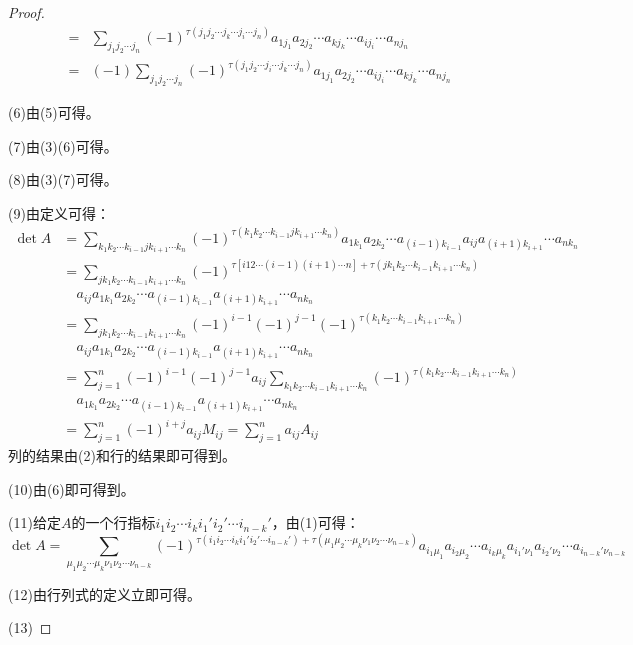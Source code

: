 \begin{proof}
\begin{align*}
		=&\sum_{j_1j_2\cdots j_n}^{}(-1)^{\tau(j_1j_2\cdots j_k\cdots j_i\cdots j_n)}a_{1j_1}a_{2j_2}\cdots a_{kj_k}\cdots a_{ij_i}\cdots a_{nj_n} \\
		=&(-1)\sum_{j_1j_2\cdots j_n}^{}(-1)^{\tau(j_1j_2\cdots j_i\cdots j_k\cdots j_n)}a_{1j_1}a_{2j_2}\cdots a_{ij_i}\cdots a_{kj_k}\cdots a_{nj_n}
	\end{align*}\par
	(6)由(5)可得。\par
	(7)由(3)(6)可得。\par
	(8)由(3)(7)可得。\par
	(9)由定义可得：
	\begin{align*}
		\det A&=\sum_{k_1k_2\cdots k_{i-1}jk_{i+1}\cdots k_n}^{}(-1)^{\tau(k_1k_2\cdots k_{i-1}jk_{i+1}\cdots k_n)}a_{1k_1}a_{2k_2}\cdots a_{(i-1)k_{i-1}}a_{ij}a_{(i+1)k_{i+1}}\cdots a_{nk_n} \\
		&=\sum_{jk_1k_2\cdots k_{i-1}k_{i+1}\cdots k_n}^{}(-1)^{\tau[i12\cdots(i-1)(i+1)\cdots n]+\tau(jk_1k_2\cdots k_{i-1}k_{i+1}\cdots k_n)} \\
		&\quad a_{ij}a_{1k_1}a_{2k_2}\cdots a_{(i-1)k_{i-1}}a_{(i+1)k_{i+1}}\cdots a_{nk_n} \\
		&=\sum_{jk_1k_2\cdots k_{i-1}k_{i+1}\cdots k_n}^{}(-1)^{i-1}(-1)^{j-1}(-1)^{\tau(k_1k_2\cdots k_{i-1}k_{i+1}\cdots k_n)} \\
		&\quad a_{ij}a_{1k_1}a_{2k_2}\cdots a_{(i-1)k_{i-1}}a_{(i+1)k_{i+1}}\cdots a_{nk_n} \\
		&=\sum_{j=1}^{n}(-1)^{i-1}(-1)^{j-1}a_{ij}\sum_{k_1k_2\cdots k_{i-1}k_{i+1}\cdots k_n}(-1)^{\tau(k_1k_2\cdots k_{i-1}k_{i+1}\cdots k_n)} \\
		&\quad a_{1k_1}a_{2k_2}\cdots a_{(i-1)k_{i-1}}a_{(i+1)k_{i+1}}\cdots a_{nk_n} \\
		&=\sum_{j=1}^{n}(-1)^{i+j}a_{ij}M_{ij}=\sum_{j=1}^{n}a_{ij}A_{ij}
	\end{align*}
	列的结果由(2)和行的结果即可得到。\par
	(10)由(6)即可得到。\par
	(11)给定$A$的一个行指标$i_1i_2\cdots i_ki_1'i_2'\cdots i_{n-k}'$，由(1)可得：
	\begin{equation*}
		\det A=\sum_{\mu_1\mu_2\cdots\mu_k\nu_1\nu_2\cdots\nu_{n-k}}(-1)^{\tau(i_1i_2\cdots i_ki_1'i_2'\cdots i_{n-k}')+\tau(\mu_1\mu_2\cdots\mu_k\nu_1\nu_2\cdots\nu_{n-k})}a_{i_1\mu_1}a_{i_2\mu_2}\cdots a_{i_k\mu_k}a_{i_1'\nu_1}a_{i_2'\nu_2}\cdots a_{i_{n-k}'\nu_{n-k}}
	\end{equation*}
	\par
	(12)由行列式的定义立即可得。\par
	(13)
\end{proof}


